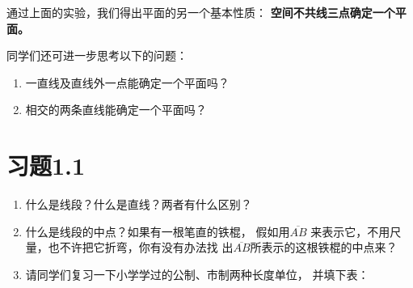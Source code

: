 通过上面的实验，我们得出平面的另一个基本性质：
\textbf{空间不共线三点确定一个平面。}

同学们还可进一步思考以下的问题：
\begin{enumerate}
	\item 一直线及直线外一点能确定一个平面吗？
	\item 相交的两条直线能确定一个平面吗？
\end{enumerate}

\section*{习题1.1}
\begin{enumerate}
	\item 什么是线段？什么是直线？两者有什么区别？
	\item 什么是线段的中点？如果有一根笔直的铁棍，
	假如用$\overline{AB}$
	来表示它，不用尺量，也不许把它折弯，你有没有办法找
	出$\overline{AB}$所表示的这根铁棍的中点来？
	\item 请同学们复习一下小学学过的公制、市制两种长度单位，
	并填下表：










\end{enumerate}



